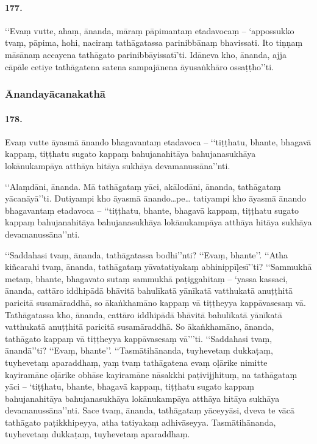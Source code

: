 \paragraph{177.} ‘‘Evaṃ vutte, ahaṃ, ānanda, māraṃ pāpimantaṃ etadavocaṃ – ‘appossukko tvaṃ, pāpima, hohi, naciraṃ tathāgatassa parinibbānaṃ bhavissati. Ito tiṇṇaṃ māsānaṃ accayena tathāgato parinibbāyissatī’ti. Idāneva kho, ānanda, ajja cāpāle cetiye tathāgatena satena sampajānena āyusaṅkhāro ossaṭṭho’’ti.

\subsubsection{Ānandayācanakathā}

\paragraph{178.} Evaṃ vutte āyasmā ānando bhagavantaṃ etadavoca – ‘‘tiṭṭhatu, bhante, bhagavā kappaṃ, tiṭṭhatu sugato kappaṃ bahujanahitāya bahujanasukhāya lokānukampāya atthāya hitāya sukhāya devamanussāna’’nti.

‘‘Alaṃdāni, ānanda. Mā tathāgataṃ yāci, akālodāni, ānanda, tathāgataṃ yācanāyā’’ti. Dutiyampi kho āyasmā ānando…pe… tatiyampi kho āyasmā ānando bhagavantaṃ etadavoca – ‘‘tiṭṭhatu, bhante, bhagavā kappaṃ, tiṭṭhatu sugato kappaṃ bahujanahitāya bahujanasukhāya lokānukampāya atthāya hitāya sukhāya devamanussāna’’nti.

‘‘Saddahasi tvaṃ, ānanda, tathāgatassa bodhi’’nti? ‘‘Evaṃ, bhante’’. ‘‘Atha kiñcarahi tvaṃ, ānanda, tathāgataṃ yāvatatiyakaṃ abhinippīḷesī’’ti? ‘‘Sammukhā metaṃ, bhante, bhagavato sutaṃ sammukhā paṭiggahitaṃ – ‘yassa kassaci, ānanda, cattāro iddhipādā bhāvitā bahulīkatā yānīkatā vatthukatā anuṭṭhitā paricitā susamāraddhā, so ākaṅkhamāno kappaṃ vā tiṭṭheyya kappāvasesaṃ vā. Tathāgatassa kho, ānanda, cattāro iddhipādā bhāvitā bahulīkatā yānīkatā vatthukatā anuṭṭhitā paricitā susamāraddhā. So ākaṅkhamāno, ānanda, tathāgato kappaṃ vā tiṭṭheyya kappāvasesaṃ vā’’’ti. ‘‘Saddahasi tvaṃ, ānandā’’ti? ‘‘Evaṃ, bhante’’. ‘‘Tasmātihānanda, tuyhevetaṃ dukkaṭaṃ, tuyhevetaṃ aparaddhaṃ, yaṃ tvaṃ tathāgatena evaṃ oḷārike nimitte kayiramāne oḷārike obhāse kayiramāne nāsakkhi paṭivijjhituṃ, na tathāgataṃ yāci – ‘tiṭṭhatu, bhante, bhagavā kappaṃ, tiṭṭhatu sugato kappaṃ bahujanahitāya bahujanasukhāya lokānukampāya atthāya hitāya sukhāya devamanussāna’’nti. Sace tvaṃ, ānanda, tathāgataṃ yāceyyāsi, dveva te vācā tathāgato paṭikkhipeyya, atha tatiyakaṃ adhivāseyya. Tasmātihānanda, tuyhevetaṃ dukkaṭaṃ, tuyhevetaṃ aparaddhaṃ.

